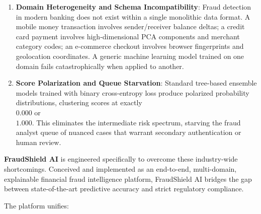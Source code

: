 \documentclass[12pt,a4paper,oneside]{report}
\begin{document}
\begin{enumerate}[leftmargin=0.35in]
\item \textbf{Domain Heterogeneity and Schema Incompatibility}: Fraud detection in modern banking does not exist within a single monolithic data format. A mobile money transaction involves sender/receiver balance deltas; a credit card payment involves high-dimensional PCA components and merchant category codes; an e-commerce checkout involves browser fingerprints and geolocation coordinates. A generic machine learning model trained on one domain fails catastrophically when applied to another.
\item \textbf{Score Polarization and Queue Starvation}: Standard tree-based ensemble models trained with binary cross-entropy loss produce polarized probability distributions, clustering scores at exactly \\$0.000$ or \\$1.000$. This eliminates the intermediate risk spectrum, starving the fraud analyst queue of nuanced cases that warrant secondary authentication or human review.
\end{enumerate}

\textbf{FraudShield AI} is engineered specifically to overcome these industry-wide shortcomings. Conceived and implemented as an end-to-end, multi-domain, explainable financial fraud intelligence platform, FraudShield AI bridges the gap between state-of-the-art predictive accuracy and strict regulatory compliance.


The platform unifies:
\end{document}
